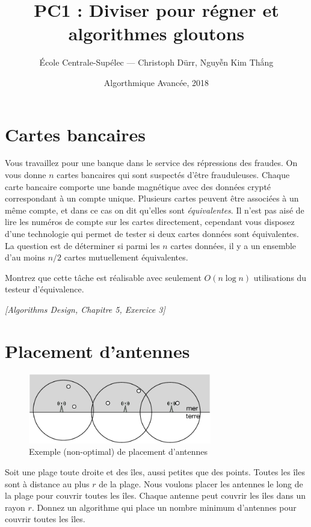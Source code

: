 \documentclass[12pt]{article}
\title{PC1 : Diviser pour régner et algorithmes gloutons}
\author{École Centrale-Supélec --- Christoph Dürr, Nguyễn Kim Thắng}
\date{Algorthmique Avancée, 2018}
\newcommand{\source}[1]{\begin{flushright}\emph{[#1]}\end{flushright}}
\begin{document}
    \maketitle

    \section{Cartes bancaires}



    Vous travaillez pour une banque dans le service des répressions des fraudes.  On vous donne $n$ cartes bancaires qui sont suspectés d'être frauduleuses. Chaque carte bancaire comporte une bande magnétique avec des données crypté correspondant à un compte unique. Plusieurs cartes peuvent être associées à un même compte, et dans ce cas on dit qu'elles sont \emph{équivalentes}.
    Il n'est pas aisé de lire les numéros de compte sur les cartes directement, cependant
    vous disposez d'une technologie qui permet de tester si deux cartes données sont équivalentes.
    La question est de déterminer si parmi les $n$ cartes données, il y a un ensemble d'au moins $n/2$ cartes mutuellement équivalentes.

    Montrez que cette tâche est réalisable avec seulement $O(n \log n)$ utilisations du testeur d'équivalence.

\source{Algorithms Design, Chapitre 5, Exercice 3}

    \section{Placement d'antennes}


\begin{figure}[h]
\centerline{\includegraphics[width=8cm]{radar-disc}}
\caption{Exemple (non-optimal) de placement d'antennes}
\end{figure}

Soit une plage toute droite et des îles, aussi petites que des points.
Toutes les îles sont à distance au plus $r$ de la plage.
Nous voulons placer les antennes le long de la plage pour couvrir toutes les îles.
Chaque antenne peut couvrir les îles dans un rayon $r$.
Donnez un algorithme qui place un nombre minimum d'antennes pour couvrir toutes les îles.  
\end{document}
